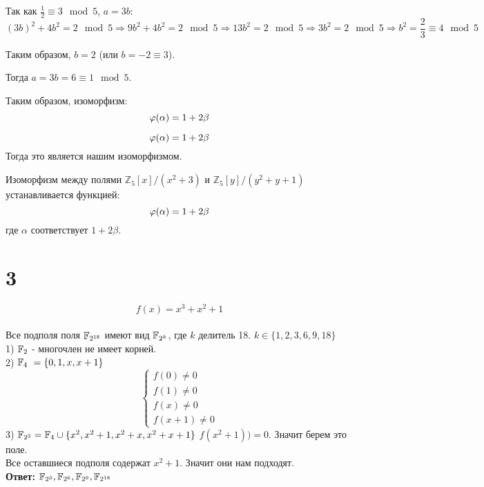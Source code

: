 		Так как \(\frac{1}{2} \equiv 3 \mod 5\), \(a = 3b\):
		\[
		(3b)^2 + 4b^2 = 2 \mod 5 \Rightarrow 9b^2 + 4b^2 = 2 \mod 5 \Rightarrow 13b^2 = 2 \mod 5 \Rightarrow 3b^2 = 2 \mod 5 \Rightarrow b^2 = \frac{2}{3} \equiv 4 \mod 5
		\]
		
		Таким образом, \(b = 2\) (или \(b = -2 \equiv 3\)).
		
		Тогда \(a = 3b = 6 \equiv 1 \mod 5\).
		
		Таким образом, изоморфизм:
		\[
		\varphi(\alpha) = 1 + 2\beta
		\]
		
		
		\[
		\varphi(\alpha) = 1 + 2\beta
		\]
		Тогда это является нашим изоморфизмом.

		
		Изоморфизм между полями \( \mathbb{Z}_5[x]/(x^2 + 3) \) и \( \mathbb{Z}_5[y]/(y^2 + y + 1) \) устанавливается функцией:
		\[
		\varphi(\alpha) = 1 + 2\beta
		\]
		где \(\alpha\) соответствует \(1 + 2\beta\).
		
\section*{3}
\[f(x) = x^3+x^2+1\]\\
 Все подполя поля \(\mathbb{F}_{2^{18}}\) имеют вид \(\mathbb{F}_{2^k}\), где \(k\) делитель 18. \(k\in \{1,2,3,6,9,18\}\)\\ 
 	1) \(\mathbb{F}_2\) -   многочлен не имеет корней.  \\
 	2)  \(\mathbb{F}_4\ = \{0,1,x, x+1\}\) 
	\[\begin{cases}f(0)\ne 0 \\ f(1)\ne 0 \\ f(x)\ne 0\\ f(x+1)\ne 0\end{cases}\] 	
	3) \(\mathbb{F}_{2^3}= \mathbb{F}_4\cup \{x^2, x^2+1, x^2+x, x^2+x+1\}\) 
	 \( f(x^2+1)) = 0\). Значит берем это поле. \\
	 Все оставшиеся подполя содержат  $x^2+1$. Значит они нам подходят. \\\textbf{Ответ:} \(\mathbb{F}_{2^3},\mathbb{F}_{2^6},\mathbb{F}_{2^9}, \mathbb{F}_{2^{18}} \)
	 
